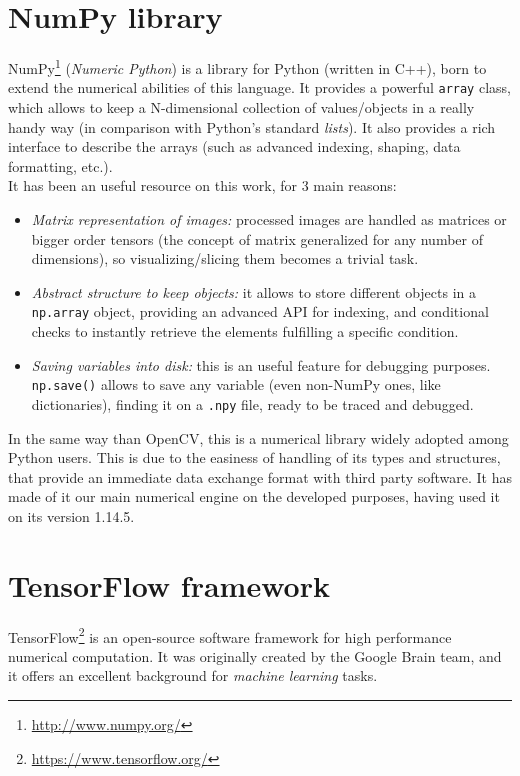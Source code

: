 \section{NumPy library}
	NumPy\footnote{\url{http://www.numpy.org/}} (\emph{Numeric Python}) is a library for Python (written in C++), born to extend the numerical abilities of this language. It provides a powerful \texttt{array} class, which allows to keep a N-dimensional collection of values/objects in a really handy way (in comparison with Python's standard \emph{lists}). It also provides a rich interface to describe the arrays (such as advanced indexing, shaping, data formatting, etc.).\\
	It has been an useful resource on this work, for 3 main reasons:
	\begin{itemize}
		\item \emph{Matrix representation of images:} processed images are handled as matrices or bigger order tensors (the concept of matrix generalized for any number of dimensions), so visualizing/slicing them becomes a trivial task.
		\item \emph{Abstract structure to keep objects:} it allows to store different objects in a \texttt{np.array} object, providing an advanced API for indexing, and conditional checks to instantly retrieve the elements fulfilling a specific condition.
		\item \emph{Saving variables into disk:} this is an useful feature for debugging purposes. \texttt{np.save()} allows to save any variable (even non-NumPy ones, like dictionaries), finding it on a \texttt{.npy} file, ready to be traced and debugged.
	\end{itemize}

In the same way than OpenCV, this is a numerical library widely adopted among Python users. This is due to the easiness of handling of its types and structures, that provide an immediate data exchange format with third party software. It has made of it our main numerical engine on the developed purposes, having used it on its version 1.14.5.



\section{TensorFlow framework}
	\label{sec:3_tensorflow}
	TensorFlow\footnote{\url{https://www.tensorflow.org/}} is an open-source software framework for high performance numerical computation. It was originally created by the Google Brain team, and it offers an excellent background for \emph{machine learning} tasks.\\
	

